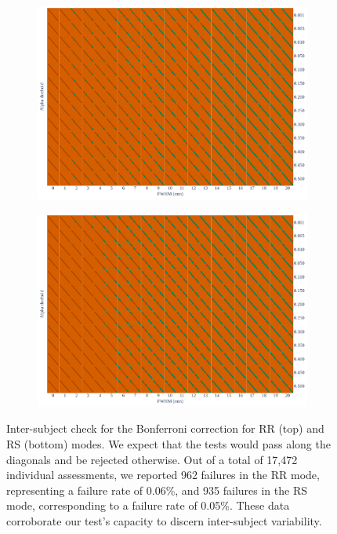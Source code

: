 \documentclass{article}
\begin{document}
\begin{figure}
    \centering
    \begin{subfigure}[t]{0.7\linewidth}
        \includegraphics[width=\linewidth]{figures/inter-subject/one_mct_fwe_bonferroni_RR.pdf}
    \end{subfigure}
    \begin{subfigure}[t]{0.7\linewidth}
        \includegraphics[width=\linewidth]{figures/inter-subject/one_mct_fwe_bonferroni_RS.pdf}
    \end{subfigure}
    \caption{Inter-subject check for the Bonferroni correction for RR (top) and RS (bottom) modes. We expect that the tests would pass along the diagonals and be rejected otherwise.
        Out of a total of 17,472 individual assessments, we reported 962 failures in the RR mode, representing a failure rate of 0.06\%, and 935 failures in the RS mode, corresponding to a failure rate of 0.05\%. These data corroborate our test's capacity to discern inter-subject variability.
    }
    \label{fig:ieee-check}
\end{figure}
\end{document}
